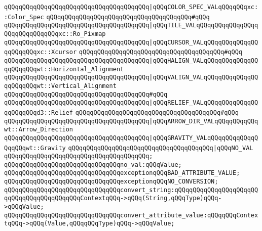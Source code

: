 \verb|qQQqqQQqqQQqqQQqqQQqqQQqqQQqqQQqqQQqqQQq|\verb#|qQQqCOLOR_SPEC_VALqQQqqQQqxc::Color_Spec#\newline
\verb|qQQqqQQqqQQqqQQqqQQqqQQqqQQqqQQqqQQqqQQq#qQQq|\newline
\verb|qQQqqQQqqQQqqQQqqQQqqQQqqQQqqQQqqQQqqQQq|\verb#|qQQqTILE_VALqQQqqQQqqQQqqQQqqQQqqQQqqQQqqQQqxc::Ro_Pixmap#\newline
\verb|qQQqqQQqqQQqqQQqqQQqqQQqqQQqqQQqqQQqqQQq|\verb#|qQQqCURSOR_VALqQQqqQQqqQQqqQQqqQQqqQQqxc::Xcursor#\newline
\verb|qQQqqQQqqQQqqQQqqQQqqQQqqQQqqQQqqQQqqQQq#qQQq|\newline
\verb|qQQqqQQqqQQqqQQqqQQqqQQqqQQqqQQqqQQqqQQq|\verb#|qQQqHALIGN_VALqQQqqQQqqQQqqQQqqQQqqQQqwt::Horizontal_Alignment#\newline
\verb|qQQqqQQqqQQqqQQqqQQqqQQqqQQqqQQqqQQqqQQq|\verb#|qQQqVALIGN_VALqQQqqQQqqQQqqQQqqQQqqQQqwt::Vertical_Alignment#\newline
\verb|qQQqqQQqqQQqqQQqqQQqqQQqqQQqqQQqqQQqqQQq#qQQq|\newline
\verb|qQQqqQQqqQQqqQQqqQQqqQQqqQQqqQQqqQQqqQQq|\verb#|qQQqRELIEF_VALqQQqqQQqqQQqqQQqqQQqqQQqd3::Relief#\newline
\verb|qQQqqQQqqQQqqQQqqQQqqQQqqQQqqQQqqQQqqQQq#qQQq|\newline
\verb|qQQqqQQqqQQqqQQqqQQqqQQqqQQqqQQqqQQqqQQq|\verb#|qQQqARROW_DIR_VALqQQqqQQqqQQqwt::Arrow_Direction#\newline
\verb|qQQqqQQqqQQqqQQqqQQqqQQqqQQqqQQqqQQqqQQq|\verb#|qQQqGRAVITY_VALqQQqqQQqqQQqqQQqqQQqwt::Gravity#\newline
\verb|qQQqqQQqqQQqqQQqqQQqqQQqqQQqqQQqqQQqqQQq|\verb#|qQQqNO_VAL#\newline
\verb|qQQqqQQqqQQqqQQqqQQqqQQqqQQqqQQqqQQqqQQq;|\newline
\newline
\verb|qQQqqQQqqQQqqQQqqQQqqQQqqQQqqQQqno_val:qQQqValue;|\newline
\newline
\verb|qQQqqQQqqQQqqQQqqQQqqQQqqQQqqQQqexceptionqQQqBAD_ATTRIBUTE_VALUE;|\newline
\verb|qQQqqQQqqQQqqQQqqQQqqQQqqQQqqQQqexceptionqQQqNO_CONVERSION;|\newline
\newline
\verb|qQQqqQQqqQQqqQQqqQQqqQQqqQQqqQQqconvert_string:qQQqqQQqqQQqqQQqqQQqqQQqqQQqqQQqqQQqqQQqqQQqContextqQQq->qQQq(String,qQQqType)qQQq->qQQqValue;|\newline
\verb|qQQqqQQqqQQqqQQqqQQqqQQqqQQqqQQqconvert_attribute_value:qQQqqQQqContextqQQq->qQQq(Value,qQQqqQQqType)qQQq->qQQqValue;|\newline
